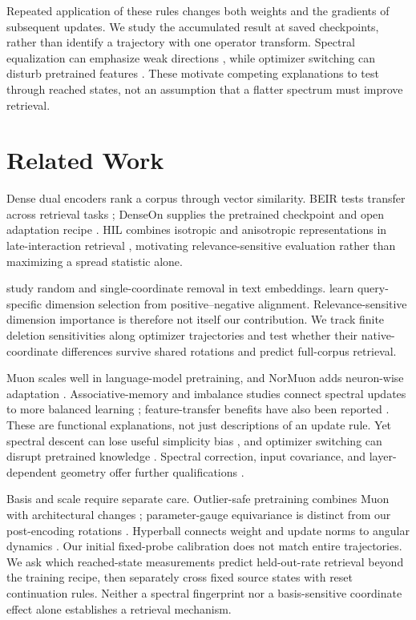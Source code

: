 \documentclass[11pt]{article}
\begin{document}
Repeated application of these rules changes both weights and the gradients of subsequent updates.
We study the accumulated result at saved checkpoints, rather than identify a trajectory with one
operator transform. Spectral equalization can emphasize weak directions
\citep{pang2026htmuon}, while optimizer switching can disturb pretrained features
\citep{qu2026finetune}. These motivate competing explanations to test through reached states,
not an assumption that a flatter spectrum must improve retrieval.

\section{Related Work}

Dense dual encoders rank a corpus through vector similarity. BEIR tests transfer across
retrieval tasks \citep{thakur2021beir}; DenseOn supplies the pretrained checkpoint and open
adaptation recipe \citep{sourty2026denseon}. HIL combines isotropic and anisotropic
representations in late-interaction retrieval \citep{kim2024hil}, motivating relevance-sensitive
evaluation rather than maximizing a spread statistic alone.

\citet{takeshita2025dimensions} study random and single-coordinate removal in text embeddings.
\citet{wu2026select} learn query-specific dimension selection from positive--negative
alignment. Relevance-sensitive dimension importance is therefore not itself our contribution.
We track finite deletion sensitivities along optimizer trajectories and test whether their
native-coordinate differences survive shared rotations and predict full-corpus retrieval.

Muon scales well in language-model pretraining, and NorMuon adds neuron-wise adaptation
\citep{liu2025muon,li2025normuon}. Associative-memory and imbalance studies connect spectral
updates to more balanced learning \citep{wang2025tailmemory,vasudeva2025spectral}; feature-transfer
benefits have also been reported \citep{ruan2026features}. These are functional explanations,
not just descriptions of an update rule. Yet spectral descent can lose useful simplicity
bias \citep{dragutinovic2026simplicity}, and optimizer switching can disrupt pretrained
knowledge \citep{qu2026finetune,liu2026consistency}. Spectral correction, input covariance,
and layer-dependent geometry offer further qualifications
\citep{pang2026htmuon,du2026newtonmuon,massena2026schatten}.

Basis and scale require separate care. Outlier-safe pretraining combines Muon with architectural
changes \citep{park2025outlier}; parameter-gauge equivariance is distinct from our post-encoding
rotations \citep{singh2026basis}. Hyperball connects weight and update norms to angular dynamics
\citep{wen2026hyperball}. Our initial fixed-probe calibration does not match entire trajectories.
We ask which reached-state measurements predict held-out-rate retrieval beyond the training
recipe, then separately cross fixed source states with reset continuation rules. Neither a
spectral fingerprint nor a basis-sensitive coordinate effect alone establishes a retrieval
mechanism.
\end{document}
